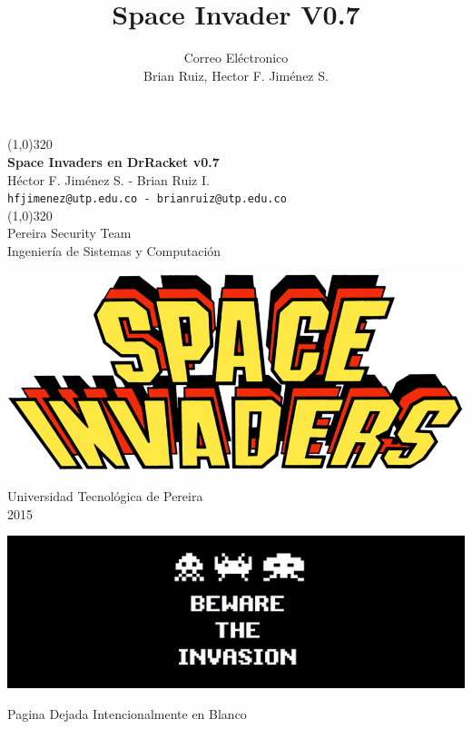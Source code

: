 \documentclass[a4paper]{article} %
\title{Space Invader V0.7 }
\author{Correo El\'ectronico \\Brian Ruiz, Hector F. Jiménez S.}
\begin{document}
\begin{titlepage} 				%
\begin{center}	  				
\vfill
\line(1,0){320}\\ 				%
\huge\textbf{Space Invaders en DrRacket v0.7}\\	
\large{Héctor F. Jiménez S. - Brian Ruiz I.}\\
\large\texttt{hfjimenez@utp.edu.co - brianruiz@utp.edu.co}\\
\line(1,0){320}\\
\large{Pereira Security Team \\Ingeniería de Sistemas y Computación}
\end{center}
\vspace{4em}
\centerline{\includegraphics[width=\textwidth]{images/logo}} 			
\begin{center}
\large{Universidad Tecnológica de Pereira \\ 2015 }\\
\end{center}
\vspace{7em}																			%
\centerline{\includegraphics[width=\textwidth]{images/slice}} 								
\end{titlepage}																			%
\clearpage
    \thispagestyle{empty}
    \phantom{a}
    \vfill
    \begin{center}Pagina Dejada Intencionalmente en Blanco\end{center}
\end{document}
